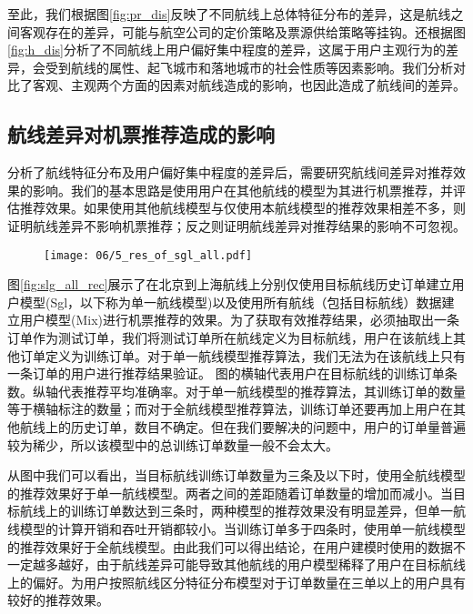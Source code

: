 至此，我们根据图\ref{fig:pr_dis}反映了不同航线上总体特征分布的差异，这是航线之间客观存在的差异，可能与航空公司的定价策略及票源供给策略等挂钩。还根据图\ref{fig:h_dis}分析了不同航线上用户偏好集中程度的差异，这属于用户主观行为的差异，会受到航线的属性、起飞城市和落地城市的社会性质等因素影响。我们分析对比了客观、主观两个方面的因素对航线造成的影响，也因此造成了航线间的差异。

\subsection{航线差异对机票推荐造成的影响}

分析了航线特征分布及用户偏好集中程度的差异后，需要研究航线间差异对推荐效果的影响。我们的基本思路是使用用户在其他航线的模型为其进行机票推荐，并评估推荐效果。如果使用其他航线模型与仅使用本航线模型的推荐效果相差不多，则证明航线差异不影响机票推荐；反之则证明航线差异对推荐结果的影响不可忽视。

\begin{figure}
 \centering
 \texttt{[image: 06/5\_res\_of\_sgl\_all.pdf]}
\end{figure}

图\ref{fig:slg_all_rec}展示了在北京到上海航线上分别仅使用目标航线历史订单建立用户模型(Sgl，以下称为单一航线模型)以及使用所有航线（包括目标航线）数据建立用户模型(Mix)进行机票推荐的效果。为了获取有效推荐结果，必须抽取出一条订单作为测试订单，我们将测试订单所在航线定义为目标航线，用户在该航线上其他订单定义为训练订单。对于单一航线模型推荐算法，我们无法为在该航线上只有一条订单的用户进行推荐结果验证。
图的横轴代表用户在目标航线的训练订单条数。纵轴代表推荐平均准确率。对于单一航线模型的推荐算法，其训练订单的数量等于横轴标注的数量；而对于全航线模型推荐算法，训练订单还要再加上用户在其他航线上的历史订单，数目不确定。但在我们要解决的问题中，用户的订单量普遍较为稀少，所以该模型中的总训练订单数量一般不会太大。

从图中我们可以看出，当目标航线训练订单数量为三条及以下时，使用全航线模型的推荐效果好于单一航线模型。两者之间的差距随着订单数量的增加而减小。当目标航线上的训练订单数达到三条时，两种模型的推荐效果没有明显差异，但单一航线模型的计算开销和吞吐开销都较小。当训练订单多于四条时，使用单一航线模型的推荐效果好于全航线模型。由此我们可以得出结论，在用户建模时使用的数据不一定越多越好，由于航线差异可能导致其他航线的用户模型稀释了用户在目标航线上的偏好。为用户按照航线区分特征分布模型对于订单数量在三单以上的用户具有较好的推荐效果。

